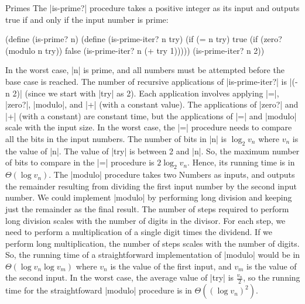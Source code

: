 \begin{schemeregion}
{\begin{example}{Primes}
The \scheme|is-prime?| procedure takes a positive integer as its input and outputs true if and only if the input number is prime:
\begin{schemedisplay}
(define (is-prime? n)
  (define (is-prime-iter? n try)
    (if (= n try)
        true
        (if (zero? (modulo n try))
            false
            (is-prime-iter? n (+ try 1)))))
  (is-prime-iter? n 2))
\end{schemedisplay}

In the worst case, \scheme|n| is prime, and all numbers must be attempted before the base case is reached.  The number of recursive applications of \scheme|is-prime-iter?| is \scheme|(- n 2)| (since we start with \scheme|try| as 2).  Each application involves applying \scheme|=|, \scheme|zero?|, \scheme|modulo|, and \scheme|+| (with a constant value).  The applications of \scheme|zero?| and \scheme|+| (with a constant) are constant time, but the applications of \scheme|=| and \scheme|modulo| scale with the input size.  In the worst case, the \scheme|=| procedure needs to compare all the bits in the input numbers.  The number of bits in \scheme|n| is $\log_2 v_n$ where $v_n$ is the value of \scheme|n|.  The value of \scheme|try| is between 2 and \scheme|n|.  So, the maximum number of bits to compare in the \scheme|=| procedure is $2 \log_2 v_n$.  Hence, its running time is in $\Theta(\log v_n)$.  The \scheme|modulo| procedure takes two Numbers as inputs, and outputs the remainder resulting from dividing the first input number by the second input number.    We could implement \scheme|modulo| by performing long division and keeping just the remainder as the final result.  The number of steps required to perform long division scales with the number of digits in the divisor.  For each step, we need to perform a multiplication of a single digit times the dividend.  If we perform long multiplication, the number of steps scales with the number of digits.  So, the running time of a straightforward implementation of \scheme|modulo| would be in $\Theta(\log v_n \log v_m)$ where $v_n$ is the value of the first input, and $v_m$ is the value of the second input.  In the worst case, the average value of \scheme|try| is $\frac{v_n}{2}$, so the running time for the straightfoward \scheme|modulo| procedure is in $\Theta((\log v_n)^2)$.  


\end{example}}
\end{schemeregion}

